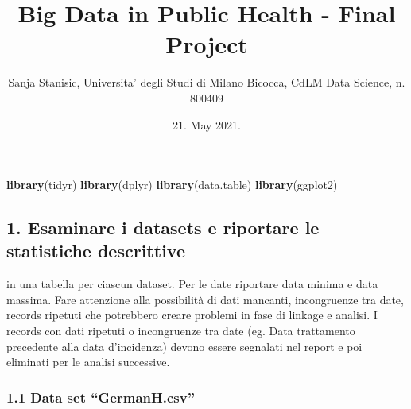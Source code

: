 \documentclass[]{article}
\title{Big Data in Public Health - Final Project}
\author{Sanja Stanisic, Universita' degli Studi di Milano Bicocca, CdLM Data
Science, n. 800409}
\date{21. May 2021.}
\newenvironment{Shaded}{\begin{snugshade}}{\end{snugshade}}
\newcommand{\KeywordTok}[1]{\textcolor[rgb]{0.13,0.29,0.53}{\textbf{#1}}}
\newcommand{\NormalTok}[1]{#1}
\newcommand{\OperatorTok}[1]{\textcolor[rgb]{0.81,0.36,0.00}{\textbf{#1}}}
\newcommand{\StringTok}[1]{\textcolor[rgb]{0.31,0.60,0.02}{#1}}
\begin{document}
\maketitle

{
\setcounter{tocdepth}{5}
\tableofcontents
}
\begin{Shaded}
\begin{Highlighting}[]
\KeywordTok{library}\NormalTok{(tidyr)}
\KeywordTok{library}\NormalTok{(dplyr)}
\KeywordTok{library}\NormalTok{(data.table)}
\KeywordTok{library}\NormalTok{(ggplot2)}
\end{Highlighting}
\end{Shaded}

\hypertarget{esaminare-i-datasets-e-riportare-le-statistiche-descrittive}{%
\subsection{1. Esaminare i datasets e riportare le statistiche
descrittive}\label{esaminare-i-datasets-e-riportare-le-statistiche-descrittive}}

in una tabella per ciascun dataset. Per le date riportare data minima e
data massima. Fare attenzione alla possibilità di dati mancanti,
incongruenze tra date, records ripetuti che potrebbero creare problemi
in fase di linkage e analisi. I records con dati ripetuti o incongruenze
tra date (eg. Data trattamento precedente alla data d'incidenza) devono
essere segnalati nel report e poi eliminati per le analisi successive.

\hypertarget{data-set-germanh.csv}{%
\subsubsection{1.1 Data set
``GermanH.csv''}\label{data-set-germanh.csv}}

\begin{Shaded}
\end{Shaded}
\end{document}
